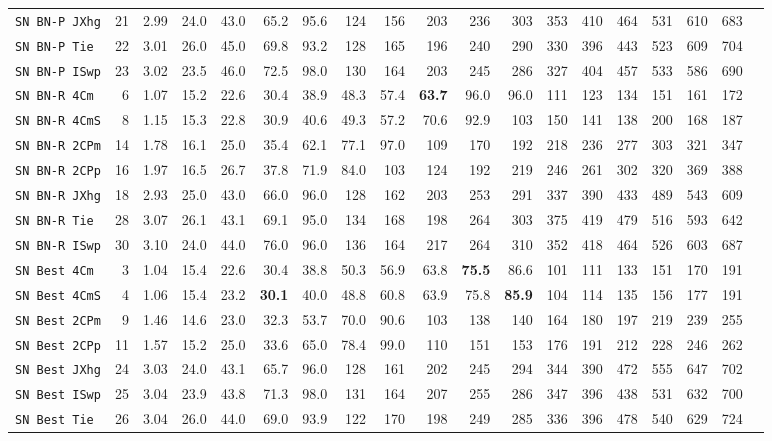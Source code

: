 \begin{tabular}{l | r @{~~} r | r@{~~}r@{~~}r@{~~}r@{~~}r@{~~}r@{~~}r@{~~}r@{~~}r@{~~}r@{~~}r@{~~}r@{~~}r@{~~}r@{~~}r@{~~}r|}
\verb+SN BN-P JXhg+ & 21 & 2.99 & 24.0&43.0&65.2&95.6&124&156&203&236&303&353&410&464&531&610&683\\
\verb+SN BN-P Tie + & 22 & 3.01 & 26.0&45.0&69.8&93.2&128&165&196&240&290&330&396&443&523&609&704\\
\verb+SN BN-P ISwp+ & 23 & 3.02 & 23.5&46.0&72.5&98.0&130&164&203&245&286&327&404&457&533&586&690\smallskip \\
\verb+SN BN-R 4Cm + & 6 & 1.07 & 15.2&22.6&30.4&38.9&48.3&57.4&\textbf{63.7}&96.0&96.0&111&123&134&151&161&172\\
\verb+SN BN-R 4CmS+ & 8 & 1.15 & 15.3&22.8&30.9&40.6&49.3&57.2&70.6&92.9&103&150&141&138&200&168&187\\
\verb+SN BN-R 2CPm+ & 14 & 1.78 & 16.1&25.0&35.4&62.1&77.1&97.0&109&170&192&218&236&277&303&321&347\\
\verb+SN BN-R 2CPp+ & 16 & 1.97 & 16.5&26.7&37.8&71.9&84.0&103&124&192&219&246&261&302&320&369&388\\
\verb+SN BN-R JXhg+ & 18 & 2.93 & 25.0&43.0&66.0&96.0&128&162&203&253&291&337&390&433&489&543&609\\
\verb+SN BN-R Tie + & 28 & 3.07 & 26.1&43.1&69.1&95.0&134&168&198&264&303&375&419&479&516&593&642\\
\verb+SN BN-R ISwp+ & 30 & 3.10 & 24.0&44.0&76.0&96.0&136&164&217&264&310&352&418&464&526&603&687\smallskip \\
\verb+SN Best 4Cm + & 3 & 1.04 & 15.4&22.6&30.4&38.8&50.3&56.9&63.8&\textbf{75.5}&86.6&101&111&133&151&170&191\\
\verb+SN Best 4CmS+ & 4 & 1.06 & 15.4&23.2&\textbf{30.1}&40.0&48.8&60.8&63.9&75.8&\textbf{85.9}&104&114&135&156&177&191\\
\verb+SN Best 2CPm+ & 9 & 1.46 & 14.6&23.0&32.3&53.7&70.0&90.6&103&138&140&164&180&197&219&239&255\\
\verb+SN Best 2CPp+ & 11 & 1.57 & 15.2&25.0&33.6&65.0&78.4&99.0&110&151&153&176&191&212&228&246&262\\
\verb+SN Best JXhg+ & 24 & 3.03 & 24.0&43.1&65.7&96.0&128&161&202&245&294&344&390&472&555&647&702\\
\verb+SN Best ISwp+ & 25 & 3.04 & 23.9&43.8&71.3&98.0&131&164&207&255&286&347&396&438&531&632&700\\
\verb+SN Best Tie + & 26 & 3.04 & 26.0&44.0&69.0&93.9&122&170&198&249&285&336&396&478&540&629&724\\
\end{tabular}
